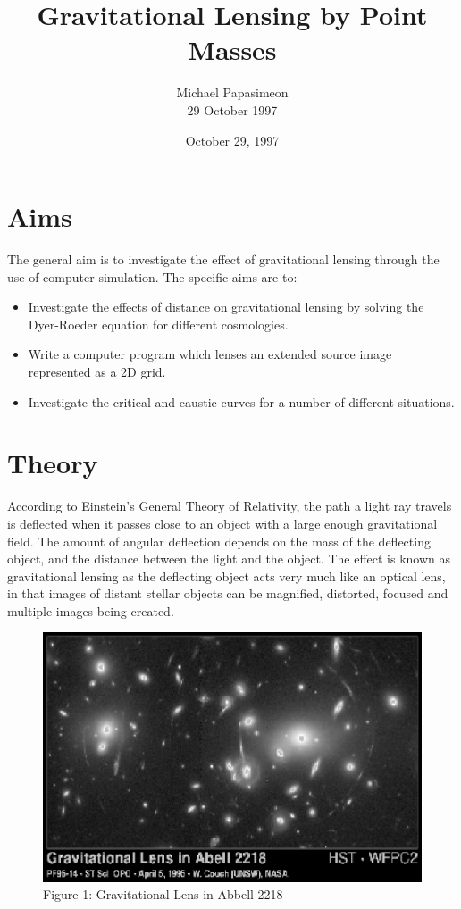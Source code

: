 \documentclass[a4paper]{IEEEtran}
\title{Gravitational Lensing by Point Masses}
\author{Michael Papasimeon\\29 October 1997}
\date{October 29, 1997}
\begin{document}
\maketitle

\section{Aims}
The general aim is to investigate the effect of gravitational lensing through the 
use of computer simulation. The specific aims are to:
\begin{itemize}
    \item Investigate the effects of distance on gravitational lensing
          by solving the Dyer-Roeder equation for different cosmologies.
    \item Write a computer program which lenses an extended source image 
          represented as a 2D grid. 
    \item Investigate the critical and caustic curves for a number of different
          situations.
\end{itemize}

\section{Theory}
According to Einstein's General Theory of Relativity, the path a light
ray travels is deflected when it passes close to an object with a large
enough gravitational field. The amount of angular deflection depends on
the mass of the deflecting object, and the distance between the light and
the object. The effect is known as gravitational lensing as the deflecting
object acts very much like an optical lens, in that images of distant
stellar objects can be magnified, distorted, focused and multiple
images being created.

\begin{figure}[h] 
    \caption{Figure 1: Gravitational Lens in Abbell 2218} 
    \label{fig:abbell} 
    \begin{center}
        \includegraphics[width=\columnwidth]{images/hubble.eps}
    \end{center}
\end{figure}
\end{document}
